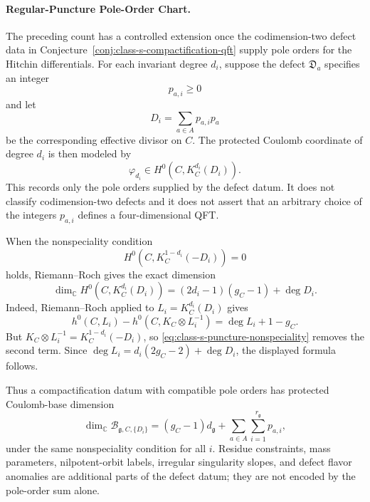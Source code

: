 \paragraph{Regular-Puncture Pole-Order Chart.}
The preceding count has a controlled extension once the codimension-two
defect data in Conjecture~\ref{conj:class-s-compactification-qft} supply
pole orders for the Hitchin differentials.  For each invariant degree
\(d_i\), suppose the defect \(\mathfrak D_a\) specifies an integer
\[
  p_{a,i}\ge0
\]
and let
\[
  D_i=\sum_{a\in A}p_{a,i}p_a
\]
be the corresponding effective divisor on \(C\).  The protected Coulomb
coordinate of degree \(d_i\) is then modeled by
\begin{equation}
  \varphi_{d_i}\in H^0(C,K_C^{d_i}(D_i)).
  \label{eq:class-s-punctured-hitchin-coordinate}
\end{equation}
This records only the pole orders supplied by the defect datum.  It does not
classify codimension-two defects and it does not assert that an arbitrary
choice of the integers \(p_{a,i}\) defines a four-dimensional QFT.

When the nonspeciality condition
\begin{equation}
  H^0(C,K_C^{1-d_i}(-D_i))=0
  \label{eq:class-s-puncture-nonspeciality}
\end{equation}
holds, Riemann--Roch gives the exact dimension
\begin{equation}
  \dim_{\mathbb C}H^0(C,K_C^{d_i}(D_i))
  =
  (2d_i-1)(g_C-1)+\deg D_i .
  \label{eq:class-s-punctured-rr-dimension}
\end{equation}
Indeed, Riemann--Roch applied to \(L_i=K_C^{d_i}(D_i)\) gives
\[
  h^0(C,L_i)-h^0(C,K_C\otimes L_i^{-1})
  =
  \deg L_i+1-g_C .
\]
But \(K_C\otimes L_i^{-1}=K_C^{1-d_i}(-D_i)\), so
\eqref{eq:class-s-puncture-nonspeciality} removes the second term.  Since
\(\deg L_i=d_i(2g_C-2)+\deg D_i\), the displayed formula follows.

Thus a compactification datum with compatible pole orders has protected
Coulomb-base dimension
\begin{equation}
  \dim_{\mathbb C}\mathcal B_{\mathfrak g,C,\{D_i\}}
  =
  (g_C-1)d_{\mathfrak g}
  +
  \sum_{a\in A}\sum_{i=1}^{r_{\mathfrak g}}p_{a,i},
  \label{eq:class-s-punctured-coulomb-dimension}
\end{equation}
under the same nonspeciality condition for all \(i\).  Residue constraints,
mass parameters, nilpotent-orbit labels, irregular singularity slopes, and
defect flavor anomalies are additional parts of the defect datum; they are
not encoded by the pole-order sum alone.

